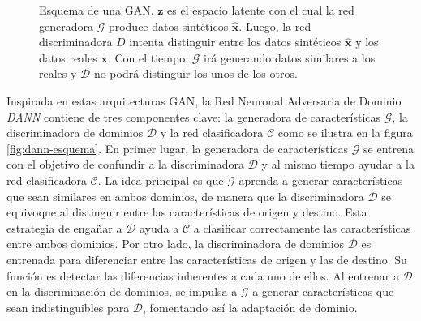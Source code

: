 \begin{figure}[H]

  \caption[Esquema de una GAN]{Esquema de una GAN. $\mathbf{z}$ es el espacio latente con el cual la red generadora $\mathcal{G}$ produce datos sintéticos $\hat{\mathbf{x}}$. Luego, la red discriminadora $D$ intenta distinguir entre los datos sintéticos $\hat{\mathbf{x}}$ y los datos reales $\mathbf{x}$. Con el tiempo, $\mathcal{G}$ irá generando datos similares a los reales y $\mathcal{D}$ no podrá distinguir los unos de los otros.}
  \label{fig:gan-esquema}
\end{figure}

Inspirada en estas arquitecturas GAN, la Red Neuronal Adversaria de Dominio {\it DANN} \parencite{ganin2016domain} contiene de tres componentes clave: la generadora de características $\mathcal{G}$, la
discriminadora de dominios $\mathcal{D}$ y la red clasificadora $\mathcal{C}$ como se ilustra en la figura
\ref{fig:dann-esquema}. En primer lugar, la generadora de características $\mathcal{G}$ se entrena con el objetivo de
confundir a la discriminadora $\mathcal{D}$ y al mismo tiempo ayudar a la red clasificadora $\mathcal{C}$. La idea
principal es que $\mathcal{G}$ aprenda a generar características que sean similares en ambos dominios, de manera que la
discriminadora $\mathcal{D}$ se equivoque al distinguir entre las características de origen y destino. Esta estrategia
de engañar a $\mathcal{D}$ ayuda a $\mathcal{C}$ a clasificar correctamente las características entre ambos dominios.
Por otro lado, la discriminadora de dominios $\mathcal{D}$ es entrenada para diferenciar entre las características de
origen y las de destino. Su función es detectar las diferencias inherentes a cada uno de ellos. Al entrenar a
$\mathcal{D}$ en la discriminación de dominios, se impulsa a $\mathcal{G}$ a generar características que sean
indistinguibles para $\mathcal{D}$, fomentando así la adaptación de dominio.

